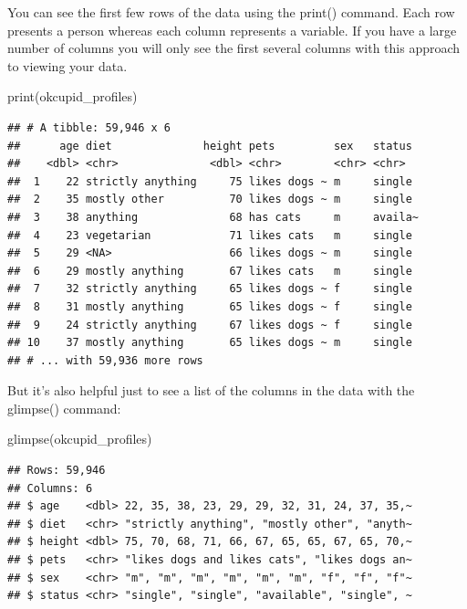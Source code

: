 \documentclass[
]{krantz}
\makeatletter
\newenvironment{Shaded}{\begin{snugshade}}{\end{snugshade}}
\newcommand{\FunctionTok}[1]{\textcolor[rgb]{0,0,0}{#1}}
\newcommand{\NormalTok}[1]{#1}
\newenvironment{kframe}{%
\medskip{}
\setlength{\fboxsep}{.8em}
 \def\at@end@of@kframe{}%
 \ifinner\ifhmode%
  \def\at@end@of@kframe{\end{minipage}}%
  \begin{minipage}{\columnwidth}%
 \fi\fi%
 \def\FrameCommand##1{\hskip\@totalleftmargin \hskip-\fboxsep
 \colorbox{shadecolor}{##1}\hskip-\fboxsep
     \hskip-\linewidth \hskip-\@totalleftmargin \hskip\columnwidth}%
 \MakeFramed {\advance\hsize-\width
   \@totalleftmargin\z@ \linewidth\hsize
   \@setminipage}}%
 {\par\unskip\endMakeFramed%
 \at@end@of@kframe}
\renewenvironment{Shaded}{\begin{kframe}}{\end{kframe}}
\makeatother
\begin{document}
You can see the first few rows of the data using the print() command. Each row presents a person whereas each column represents a variable. If you have a large number of columns you will only see the first several columns with this approach to viewing your data.

\begin{Shaded}
\begin{Highlighting}[]
\FunctionTok{print}\NormalTok{(okcupid\_profiles)}
\end{Highlighting}
\end{Shaded}

\begin{verbatim}
## # A tibble: 59,946 x 6
##      age diet              height pets         sex   status 
##    <dbl> <chr>              <dbl> <chr>        <chr> <chr>  
##  1    22 strictly anything     75 likes dogs ~ m     single 
##  2    35 mostly other          70 likes dogs ~ m     single 
##  3    38 anything              68 has cats     m     availa~
##  4    23 vegetarian            71 likes cats   m     single 
##  5    29 <NA>                  66 likes dogs ~ m     single 
##  6    29 mostly anything       67 likes cats   m     single 
##  7    32 strictly anything     65 likes dogs ~ f     single 
##  8    31 mostly anything       65 likes dogs ~ f     single 
##  9    24 strictly anything     67 likes dogs ~ f     single 
## 10    37 mostly anything       65 likes dogs ~ m     single 
## # ... with 59,936 more rows
\end{verbatim}

But it's also helpful just to see a list of the columns in the data with the glimpse() command:

\begin{Shaded}
\begin{Highlighting}[]
\FunctionTok{glimpse}\NormalTok{(okcupid\_profiles)}
\end{Highlighting}
\end{Shaded}

\begin{verbatim}
## Rows: 59,946
## Columns: 6
## $ age    <dbl> 22, 35, 38, 23, 29, 29, 32, 31, 24, 37, 35,~
## $ diet   <chr> "strictly anything", "mostly other", "anyth~
## $ height <dbl> 75, 70, 68, 71, 66, 67, 65, 65, 67, 65, 70,~
## $ pets   <chr> "likes dogs and likes cats", "likes dogs an~
## $ sex    <chr> "m", "m", "m", "m", "m", "m", "f", "f", "f"~
## $ status <chr> "single", "single", "available", "single", ~
\end{verbatim}
\end{document}
